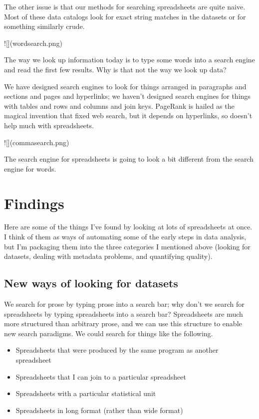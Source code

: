 \documentclass{acm_proc_article-sp}
\begin{document}
The other issue is that our methods for searching spreadsheets are quite naive.
Most of these data catalogs look for exact string matches in the datasets or
for something similarly crude.

![](wordsearch.png)

The way we look up information today is to type some words into a search engine
and read the first few results. Why is that not the way we look up data?

We have designed search engines to look for things arranged in paragraphs
and sections and pages and hyperlinks; we haven't designed search engines for
things with tables and rows and columns and join keys.
PageRank is hailed as the magical invention that
fixed web search, but it depends on hyperlinks, so doesn't help much with spreadsheets.

![](commasearch.png)

The search engine for spreadsheets is going to look a bit different from
the search engine for words.















\section{Findings}
Here are some of the things I've found by looking at lots of spreadsheets at
once. I think of them as ways of automating some of the early steps in data
analysis, but I'm packaging them into the three categories I mentioned above
(looking for datasets, dealing with metadata problems, and quantifying quality).

\subsection{New ways of looking for datasets}
We search for prose by typing prose into a search bar; why don't
we search for spreadsheets by typing spreadsheets into a search bar?
Spreadsheets are much more structured than arbitrary prose, and we
can use this structure to enable new search paradigms. We could search
for things like the following.

\begin{itemize}
\item Spreadsheets that were produced by the same program as another spreadsheet
\item Spreadsheets that I can join to a particular spreadsheet
\item Spreadsheets with a particular statistical unit
\item Spreadsheets in long format (rather than wide format)
\end{itemize}
\end{document}
